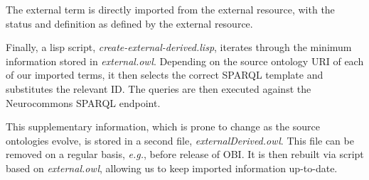 \documentclass[a4paper,10pt,twocolumn]{article}
\begin{document}




The external term is directly imported from the external resource, with the status and definition as defined by the external resource. %

Finally, a lisp script, \emph{create-external-derived.lisp}, iterates through the minimum information stored in \emph{external.owl}.
Depending on the source ontology URI of each of our imported terms, it then selects the correct SPARQL template and substitutes the relevant ID.
The queries are then executed against the Neurocommons SPARQL endpoint\cite{RefWorks:1540}.

This supplementary information, which is prone to change as the source ontologies evolve, is stored in a second file, \emph{externalDerived.owl}.%
This file can be removed on a regular basis, \emph{e.g.}, before release of OBI.
It is then rebuilt via script based on \emph{external.owl}, allowing us to keep imported information up-to-date.
\end{document}
